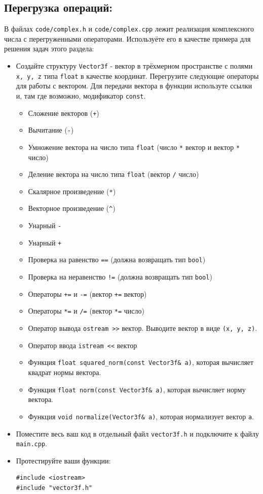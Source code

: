 \documentclass{article}
\begin{document}
\subsection*{Перегрузка операций:}
В файлах \texttt{code/complex.h} и \texttt{code/complex.cpp} лежит реализация комплексного числа с перегруженными операторами. Используёте его в качестве примера для решения задач этого раздела:
\begin{itemize}
\item Создайте структуру \texttt{Vector3f} - вектор в трёхмерном пространстве с полями \texttt{x, y, z} типа \texttt{float} в качестве координат. Перегрузите следующие операторы для работы с вектором. Для передачи вектора в функции используте ссылки и, там где возможно, модификатор \texttt{const}.
	\begin{itemize}
	\item Сложение векторов (\texttt{+})
	\item Вычитание (\texttt{-})
	\item Умножение вектора на число типа \texttt{float} (число \texttt{*} вектор и вектор \texttt{*} число)
	\item Деление вектора на число типа \texttt{float} (вектор \texttt{/} число)
	\item Скалярное произведение (\texttt{*})
	\item Векторное произведение (\texttt{\^})
	\item Унарный \texttt{-}
	\item Унарный \texttt{+}
	\item Проверка на равенство \texttt{==}  (должна возвращать тип \texttt{bool})
	\item Проверка на неравенство \texttt{!=}  (должна возвращать тип \texttt{bool})
	\item Операторы \texttt{+=} и \texttt{-=}  (вектор \texttt{+=} вектор)
	\item Операторы \texttt{*=} и \texttt{/=}  (вектор \texttt{*=} число)
	\item Оператор вывода  \texttt{ostream >{}>} вектор. Выводите вектор в виде \texttt{(x, y, z)}.
	\item Оператор ввода  \texttt{istream <{}<} вектор
	\item Функция \texttt{float squared\_norm(const Vector3f\& a)}, которая вычисляет квадрат нормы вектора.
	\item Функция \texttt{float norm(const Vector3f\& a)}, которая вычисляет норму вектора.
	\item Функция \texttt{void normalize(Vector3f\& a)}, которая нормализует вектор \texttt{a}.
	\end{itemize}
\item Поместите весь ваш код в отдельный файл \texttt{vector3f.h} и подключите к файлу \texttt{main.cpp}.
\item Протестируйте ваши функции:
\begin{lstlisting}
#include <iostream>
#include "vector3f.h"


\end{lstlisting}
\end{itemize}
\end{document}
